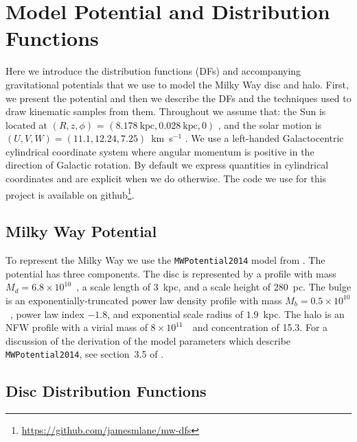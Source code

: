 \section{Model Potential and Distribution Functions}
\label{ch2:sec:ModelPotentialandDistributionFunctions}

Here we introduce the distribution functions (DFs) and accompanying gravitational potentials that we use to model the Milky Way disc and halo. First, we present the potential and then we describe the DFs and the techniques used to draw kinematic samples from them. Throughout we assume that: the Sun is located at $(R,z,\phi)$ = $(8.178~\text{kpc}, 0.028~\text{kpc}, 0)$ \parencite{gravity19,bennett19}, and the solar motion is $(U,V,W) = (11.1, 12.24, 7.25)$~km~s$^{-1}$ \parencite{schoenrich10}. We use a left-handed Galactocentric cylindrical coordinate system where angular momentum is positive in the direction of Galactic rotation. By default we express quantities in cylindrical coordinates and are explicit when we do otherwise. The code we use for this project is available on github\footnote{\url{https://github.com/jamesmlane/mw-dfs}}.

\subsection{Milky Way Potential}
\label{ch2:subsec:MilkWayPotential}

To represent the Milky Way we use the \texttt{MWPotential2014} model from \textcite{bovy15}. The potential has three components. The disc is represented by a \textcite{miyamoto75} profile with mass $M_{d} = 6.8\times10^{10}$~\Msun, a scale length of $3$~kpc, and a scale height of $280$~pc. The bulge is an exponentially-truncated power law density profile with mass $M_{b} = 0.5\times10^{10}$~\Msun, power law index $-1.8$, and exponential scale radius of $1.9$~kpc. The halo is an NFW \parencite{navarro97} profile with a virial mass of $8\times10^{11}$~\Msun\ and concentration of 15.3. For a discussion of the derivation of the model parameters which describe \texttt{MWPotential2014}, see section~3.5 of \textcite{bovy15}.

\subsection{Disc Distribution Functions}
\label{ch2:subsec:DiscDistributionFunctions}

